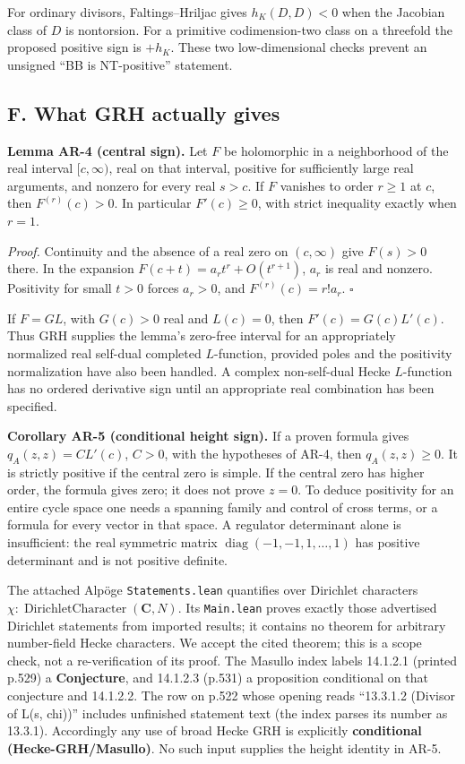 \documentclass[11pt,a4paper]{article}
\begin{document}
For ordinary divisors, Faltings--Hriljac gives \(h_K(D,D)<0\) when the
Jacobian class of \(D\) is nontorsion. For a primitive codimension-two
class on a threefold the proposed positive sign is \(+h_K\). These two
low-dimensional checks prevent an unsigned ``BB is NT-positive''
statement.

\subsection{F. What GRH actually
gives}\label{f.-what-grh-actually-gives}

\textbf{Lemma AR-4 (central sign).} Let \(F\) be holomorphic in a
neighborhood of the real interval \([c,\infty)\), real on that interval,
positive for sufficiently large real arguments, and nonzero for every
real \(s>c\). If \(F\) vanishes to order \(r\ge1\) at \(c\), then
\(F^{(r)}(c)>0\). In particular \(F'(c)\ge0\), with strict inequality
exactly when \(r=1\).

\emph{Proof.} Continuity and the absence of a real zero on
\((c,\infty)\) give \(F(s)>0\) there. In the expansion
\(F(c+t)=a_rt^r+O(t^{r+1})\), \(a_r\) is real and nonzero. Positivity
for small \(t>0\) forces \(a_r>0\), and \(F^{(r)}(c)=r!a_r\).
\(\square\)

If \(F=G L\), with \(G(c)>0\) real and \(L(c)=0\), then
\(F'(c)=G(c)L'(c)\). Thus GRH supplies the lemma's zero-free interval
for an appropriately normalized real self-dual completed \(L\)-function,
provided poles and the positivity normalization have also been handled.
A complex non-self-dual Hecke \(L\)-function has no ordered derivative
sign until an appropriate real combination has been specified.

\textbf{Corollary AR-5 (conditional height sign).} If a proven formula
gives \(q_A(z,z)=C L'(c)\), \(C>0\), with the hypotheses of AR-4, then
\(q_A(z,z)\ge0\). It is strictly positive if the central zero is simple.
If the central zero has higher order, the formula gives zero; it does
not prove \(z=0\). To deduce positivity for an entire cycle space one
needs a spanning family and control of cross terms, or a formula for
every vector in that space. A regulator determinant alone is
insufficient: the real symmetric matrix
\(\operatorname{diag}(-1,-1,1,\ldots,1)\) has positive determinant and
is not positive definite.

The attached Alpöge \texttt{Statements.lean} quantifies over Dirichlet
characters \(\chi:\operatorname{DirichletCharacter}(\mathbf C,N)\). Its
\texttt{Main.lean} proves exactly those advertised Dirichlet statements
from imported results; it contains no theorem for arbitrary number-field
Hecke characters. We accept the cited theorem; this is a scope check,
not a re-verification of its proof. The Masullo index labels 14.1.2.1
(printed p.529) a \textbf{Conjecture}, and 14.1.2.3 (p.531) a
proposition conditional on that conjecture and 14.1.2.2. The row on
p.522 whose opening reads ``13.3.1.2 (Divisor of L(s, chi))'' includes
unfinished statement text (the index parses its number as 13.3.1).
Accordingly any use of broad Hecke GRH is explicitly \textbf{conditional
(Hecke-GRH/Masullo)}. No such input supplies the height identity in
AR-5.
\end{document}
